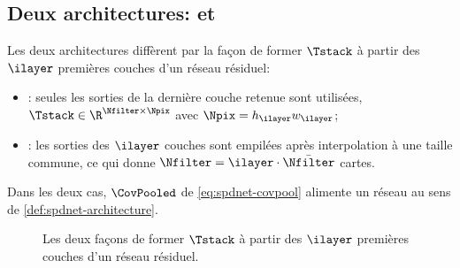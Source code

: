 
\subsection{Deux architectures:  et }
\label{sec:spdnet-covpool-archi}

\begin{definition}
\label{def:spdnet-rcnet}
  Les deux architectures diffèrent par la façon de former $\Tstack$ à partir des
  $\ilayer$ premières couches d'un réseau résiduel:
  \begin{itemize}
    \item {}: seules les sorties de la dernière couche retenue
      sont utilisées, $\Tstack\in\R^{\Nfilter\times\Npix}$ avec
      $\Npix=h_\ilayer w_\ilayer$;
    \item {}: les sorties des $\ilayer$ couches sont empilées
      après interpolation à une taille commune, ce qui donne
      $\Nfilter=\ilayer\cdot\bar{\Nfilter}$ cartes.
  \end{itemize}
  Dans les deux cas, $\CovPooled$ de \cref{eq:spdnet-covpool} alimente un réseau
  \SPDnet{} au sens de \cref{def:spdnet-architecture}.
\end{definition}

\begin{figure}[htb]
  \begin{center}
    \makebox[\textwidth][c]{}
  \end{center}
  \caption{Les deux façons de former $\Tstack$ à partir des $\ilayer$ premières
    couches d'un réseau résiduel. %
  }
  \label{fig:spdnet-rcnet-srcnet}
\end{figure}

